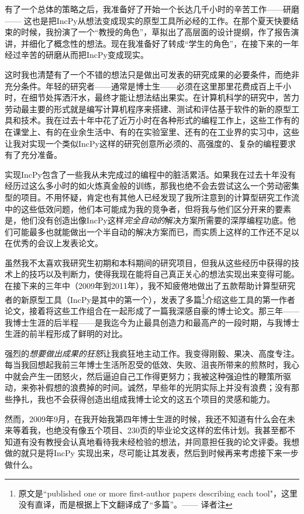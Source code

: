 \documentclass[letter,12pt]{book}
\begin{document}
\begin{CJK}{UTF8}{gbsn}
有了一个总体的策略之后，我准备好了开始一个长达几千小时的辛苦工作——研磨—— 这也是把IncPy从想法变成现实的原型工具所必经的工作。在那个夏天快要结束的时候，我扮演了一个“教授的角色”，草拟出了高层面的设计提纲，作了报告演讲，并细化了概念性的想法。现在我准备好了转成“学生的角色”，在接下来的一年经过辛苦的研磨从而把IncPy变成现实。

\breakline

这时我也清楚有了一个不错的想法只是做出可发表的研究成果的必要条件，而绝非充分条件。年轻的研究者——通常是博士生——必须在这里那里花费成百上千小时，在细节处挥洒汗水，最终才能让想法结出果实。在计算机科学的研究中，苦力劳动最主要的形式就是编写计算机程序来搭建、测试和评估基于软件的新的原型工具和技术。我在过去十年中花了近万小时在各种形式的编程工作上，这些工作有的在课堂上、有的在业余生活中、有的在实验室里、还有的在工业界的实习中，这些让我对实现一个类似IncPy这样的研究创意所必须的、高强度的、复杂的编程要求有了充分准备。

实现IncPy包含了一些我从未完成过的编程中的脏活累活。如果我在过去十年没有经历过这么多小时的如火炼真金般的训练，那我也绝不会去尝试这么一个劳动密集型的项目。不用怀疑，肯定也有其他人已经发现了我所注意到的计算型研究工作流中的这些低效问题，他们本可能成为我的竞争者，但将我与他们区分开来的要素是，他们没有创造出像IncPy这样\emph{完全自动的}解决方案所需要的深厚编程功底。他们可能最多也就能做出一个半自动的解决方案而已，而实质上这样的工作还不足以在优秀的会议上发表论文。

虽然我不太喜欢我研究生初期和本科期间的研究项目，但我从这些经历中获得的技术上的技巧以及判断力，使得我现在能将自己真正关心的想法实现出来变得可能。在接下来的三年中（2009年到2011年），我不知疲倦地做出了五款帮助计算型研究者的新原型工具（IncPy是其中的第一个），发表了多篇\footnote{原文是``published one or more first-author papers describing each tool"，这里没有直译，而是根据上下文翻译成了“多篇”。—— 译者注}介绍这些工具的第一作者论文，接着将这些工作组合在一起形成了一篇我深感自豪的博士论文。那三年——我博士生涯的后半程——是我迄今为止最具创造力和最高产的一段时期，与我博士生涯的前半程形成了鲜明的对比。

强烈的\emph{想要做出成果的狂怒}让我疯狂地主动工作。我变得刚毅、果决、高度专注。每当我回想起我前三年博士生活所忍受的低效、失败、沮丧所带来的煎熬时，我心中就会产生一团怒火，然后逼迫自己工作得更努力；我被这种强迫性的鞭策所驱动，来弥补假想的浪费掉的时间。诚然，早些年的光阴实际上并没有浪费；没有那些挣扎，我也不会获得创造出组成我博士论文的这五个项目的灵感和能力。

\breakline

然而，2009年9月，在我开始我第四年博士生涯的时候，我还不知道有什么会在未来等着我，也绝没有像五个项目、230页的毕业论文这样的宏伟计划。我甚至都不知道有没有教授会认真地看待我未经检验的想法，并同意担任我的论文评委。我想做的就只是将IncPy 实现出来，尽可能让其发表，然后到时候再来考虑接下来一步做什么。


\end{CJK}
\end{document}
